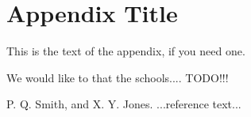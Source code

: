 \documentclass[preprint]{sigplanconf}
\newcommand{\todo}{TODO!!!}
\begin{document}
\appendix
\section{Appendix Title}

This is the text of the appendix, if you need one.

\acks

We would like to that the schools.... \todo




\begin{thebibliography}{}
\softraggedright

P. Q. Smith, and X. Y. Jones. ...reference text...

\end{thebibliography}
\end{document}
